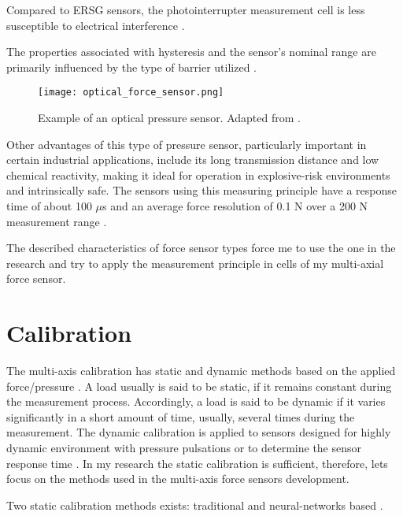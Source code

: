 Compared to ERSG sensors, the photointerrupter measurement cell is less susceptible to electrical interference \cite*{my_love_pressure_photosensor}. 

The properties associated with hysteresis and the sensor's nominal range are primarily influenced by the type of barrier utilized \cite{my_love_pressure_photosensor}.
\begin{figure}[t]
\centering
\texttt{[image: optical\_force\_sensor.png]}
\caption{Example of an optical pressure sensor. Adapted from \cite[Fig. 5]{pressure_sens_calibration_stat_dyn}.}
\label{fig:optical_sensor_arrangement}

\end{figure}

Other advantages of this type of pressure sensor, particularly important in certain industrial applications, 
include its long transmission distance and low chemical reactivity, making it ideal for operation in explosive-risk environments and intrinsically safe. 
The sensors using this measuring principle have a response time of about 100 $\mu$s and an average force resolution of 0.1 N over a 200 N 
measurement range \cite{pressure_sens_calibration_stat_dyn}.

The described characteristics of force sensor types force me to use the one in the research and try to apply the measurement principle in cells of my multi-axial force sensor.

\section{Calibration}
\label{lr_calibration}
The multi-axis calibration has static and dynamic methods based on the applied force/pressure \cite{Static_Dynamic_Calibration_FlexiForce, pressure_sens_calibration_stat_dyn}.
A load usually is said to be static, if it remains constant during the measurement process. 
Accordingly, a load is said to be dynamic if it varies significantly in a short amount of time, usually, several times during the measurement.
The dynamic calibration is applied to sensors designed for highly dynamic environment with pressure pulsations or to determine the sensor response time \cite{pressure_sens_calibration_stat_dyn}. 
In my research the static calibration is sufficient, therefore, lets focus on the methods used in the multi-axis force sensors development.

Two static calibration methods exists: traditional and neural-networks based \cite{NN_decoupling, Deep_Learning_Calib}. %

